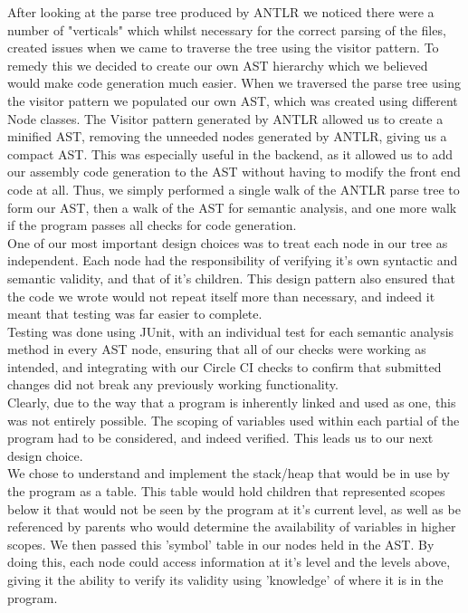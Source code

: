 \documentclass[a4paper, 11pt]{article} %
\begin{document}


After looking at the parse tree produced by ANTLR we noticed there were a number of "verticals" which whilst necessary for the correct parsing of the files, created issues when we came to traverse the tree using the visitor pattern. To remedy this we decided to create our own AST hierarchy which we believed would make code generation much easier. When we traversed the parse tree using the visitor pattern we populated our own AST, which was created using different Node classes. The Visitor pattern generated by ANTLR allowed us to create a minified AST, removing the unneeded nodes generated by ANTLR, giving us a compact AST. This was especially useful in the backend, as it allowed us to add our assembly code generation to the AST without having to modify the front end code at all. Thus, we simply performed a single walk of the ANTLR parse tree to form our AST, then a walk of the AST for semantic analysis, and one more walk if the program passes all checks for code generation. \\

One of our most important design choices was to treat each node in our tree as independent. Each node had the responsibility of verifying it's own syntactic and semantic validity, and that of it's children. This design pattern also ensured that the code we wrote would not repeat itself more than necessary, and indeed it meant that testing was far easier to complete. \\

Testing was done using JUnit, with an individual test for each semantic analysis method in every AST node, ensuring that all of our checks were working as intended, and integrating with our Circle CI checks to confirm that submitted changes did not break any previously working functionality. \\

Clearly, due to the way that a program is inherently linked and used as one, this was not entirely possible. The scoping of variables used within each partial of the program had to be considered, and indeed verified. This leads us to our next design choice. \\

We chose to understand and implement the stack/heap that would be in use by the program as a table. This table would hold children that represented scopes below it that would not be seen by the program at it's current level, as well as be referenced by parents who would determine the availability of variables in higher scopes. We then passed this 'symbol' table in our nodes held in the AST. By doing this, each node could access information at it's level and the levels above, giving it the ability to verify its validity using 'knowledge' of where it is in the program. \\
\end{document}
